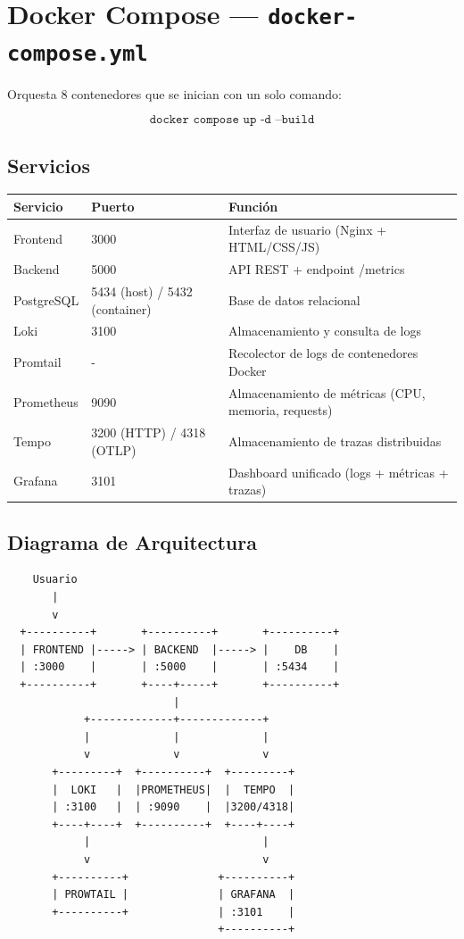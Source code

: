 \documentclass[12pt,oneside]{article}
\begin{document}
\section{Docker Compose — \texttt{docker-compose.yml}}

Orquesta 8 contenedores que se inician con un solo comando:

\[
\texttt{docker compose up -d --build}
\]

\subsection{Servicios}

\begin{longtable}{|p{2.5cm}|p{2.5cm}|p{9cm}|}
\hline
\textbf{Servicio} & \textbf{Puerto} & \textbf{Función} \\
\hline
Frontend & 3000 & Interfaz de usuario (Nginx + HTML/CSS/JS) \\
\hline
Backend & 5000 & API REST + endpoint /metrics \\
\hline
PostgreSQL & 5434 (host) / 5432 (container) & Base de datos relacional \\
\hline
Loki & 3100 & Almacenamiento y consulta de logs \\
\hline
Promtail & - & Recolector de logs de contenedores Docker \\
\hline
Prometheus & 9090 & Almacenamiento de métricas (CPU, memoria, requests) \\
\hline
Tempo & 3200 (HTTP) / 4318 (OTLP) & Almacenamiento de trazas distribuidas \\
\hline
Grafana & 3101 & Dashboard unificado (logs + métricas + trazas) \\
\hline
\end{longtable}

\subsection{Diagrama de Arquitectura}

\begin{verbatim}
    Usuario
       |
       v
  +----------+       +----------+       +----------+
  | FRONTEND |-----> | BACKEND  |-----> |    DB    |
  | :3000    |       | :5000    |       | :5434    |
  +----------+       +----+-----+       +----------+
                          |
            +-------------+-------------+
            |             |             |
            v             v             v
       +---------+  +----------+  +---------+
       |  LOKI   |  |PROMETHEUS|  |  TEMPO  |
       | :3100   |  | :9090    |  |3200/4318|
       +----+----+  +----------+  +----+----+
            |                           |
            v                           v
       +----------+              +----------+
       | PROWTAIL |              | GRAFANA  |
       +----------+              | :3101    |
                                 +----------+
\end{verbatim}
\end{document}
